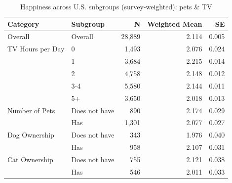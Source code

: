 \begin{table}[htbp]
\centering
\caption{Happiness across U.S. subgroups (survey-weighted): pets & TV}
\begin{tabular}{llrrr}
\toprule
Category & Subgroup & N & Weighted Mean & SE \\
\midrule
Overall & Overall & 28,889 & 2.114 & 0.005 \\
\midrule
TV Hours per Day & 0 & 1,493 & 2.076 & 0.024 \\
 & 1 & 3,684 & 2.215 & 0.014 \\
 & 2 & 4,758 & 2.148 & 0.012 \\
 & 3-4 & 5,580 & 2.144 & 0.011 \\
 & 5+ & 3,650 & 2.018 & 0.013 \\
\midrule
Number of Pets & Does not have & 890 & 2.174 & 0.029 \\
 & Has & 1,301 & 2.077 & 0.027 \\
\midrule
Dog Ownership & Does not have & 343 & 1.976 & 0.040 \\
 & Has & 958 & 2.107 & 0.031 \\
\midrule
Cat Ownership & Does not have & 755 & 2.121 & 0.038 \\
 & Has & 546 & 2.011 & 0.033 \\
\bottomrule
\end{tabular}
\end{table}
